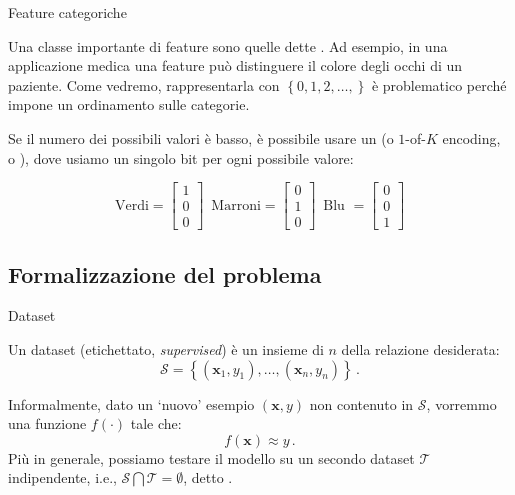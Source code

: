 \documentclass[12pt,aspectratio=169]{beamer}
\begin{document}
\begin{frame}{Feature categoriche}
	
	Una classe importante di feature sono quelle dette . Ad esempio, in una applicazione medica una feature può distinguere il colore degli occhi di un paziente. Come vedremo, rappresentarla con $\left\{0, 1, 2, \ldots, \right\}$ è problematico perché impone un ordinamento sulle categorie.
	
	Se il numero dei possibili valori è basso, è possibile usare un  (o $1$-of-$K$ encoding, o ), dove usiamo un singolo bit per ogni possibile valore:
	
	$$
	\text{Verdi} = 
	\begin{bmatrix}
		1 \\ 0 \\ 0
	\end{bmatrix}
	\,\,\,
	\text{Marroni} =
	\begin{bmatrix}
		0 \\ 1 \\ 0
	\end{bmatrix}
	\,\,\,
	\text{Blu	} =
	\begin{bmatrix}
		0 \\ 0 \\ 1
	\end{bmatrix}
	$$
	
\end{frame}

\subsection{Formalizzazione del problema}

\begin{frame}{Dataset}
	
	\begin{tcolorbox}
		Un dataset (etichettato, \textit{supervised}) è un insieme di $n$  della relazione desiderata:
		\begin{equation}
			\mathcal{S} = \left\{ (\mathbf{x}_1, y_1), \ldots, (\mathbf{x}_n, y_n) \right\} \,.
		\end{equation}
	\end{tcolorbox}
	
	Informalmente, dato un `nuovo' esempio $(\mathbf{x},y)$ non contenuto in $\mathcal{S}$, vorremmo una funzione $f(\cdot)$ tale che:
	\begin{equation}
		f(\mathbf{x}) \approx y \,.
	\end{equation}
	Più in generale, possiamo testare il modello su un secondo dataset $\mathcal{T}$ indipendente, i.e., $\mathcal{S} \bigcap \mathcal{T} = \emptyset$, detto .
	
\end{frame}
\end{document}
